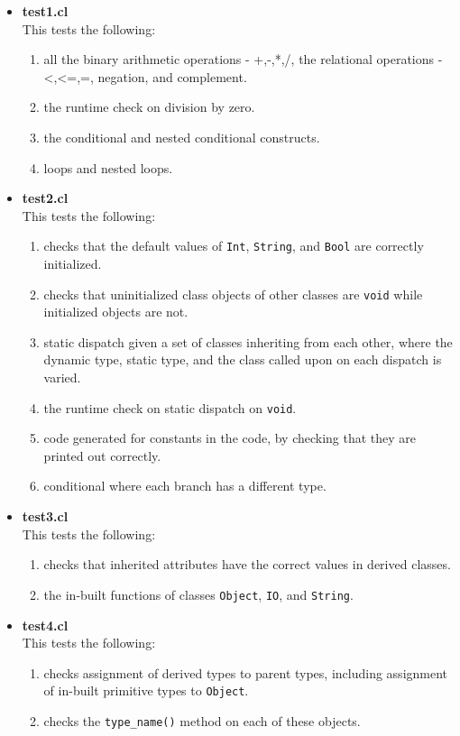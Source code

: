 \documentclass{article}
\begin{document}
\begin{itemize}
	\item \textbf{test1.cl} \\
	This tests the following:
	\begin{enumerate}
		\item all the binary arithmetic operations - +,-,*,/, the relational operations - <,<=,=, negation, and complement. 
		\item the runtime check on division by zero.
		\item the conditional and nested conditional constructs. 
		\item loops and nested loops.
	\end{enumerate}
	\item \textbf{test2.cl} \\
	This tests the following:
	\begin{enumerate}
		\item checks that the default values of \verb|Int|, \verb|String|, and \verb|Bool| are correctly initialized.
		\item checks that uninitialized class objects of other classes are \verb|void| while initialized objects are not.
		\item static dispatch given a set of classes inheriting from each other, where the dynamic type, static type, and the class called upon on each dispatch is varied.
		\item the runtime check on static dispatch on \verb|void|.
		\item code generated for constants in the code, by checking that they are printed out correctly.
		\item conditional where each branch has a different type.
	\end{enumerate}
	\item \textbf{test3.cl} \\
	This tests the following:
	\begin{enumerate}
		\item checks that inherited attributes have the correct values in derived classes.
		\item the in-built functions of classes \verb|Object|, \verb|IO|, and \verb|String|.
	\end{enumerate}
	\item \textbf{test4.cl} \\
	This tests the following:
	\begin{enumerate}
		\item checks assignment of derived types to parent types, including assignment of in-built primitive types to \verb|Object|.
		\item checks the \verb|type_name()| method on each of these objects.	
	\end{enumerate}
	
\end{itemize}
\end{document}
